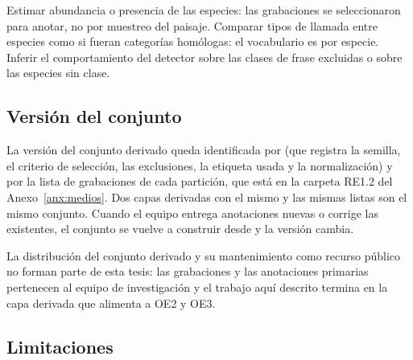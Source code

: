  Estimar abundancia o presencia de las especies:
las grabaciones se seleccionaron para anotar, no por muestreo del paisaje.
Comparar tipos de llamada entre especies como si fueran categorías homólogas: el
vocabulario es por especie. Inferir el comportamiento del detector sobre las
clases de frase excluidas o sobre las especies sin clase.

\subsection{Versión del conjunto}

La versión del conjunto derivado queda identificada por  (que
registra la semilla, el criterio de selección, las exclusiones, la etiqueta usada
y la normalización) y por la lista de grabaciones de cada partición, que está en
la carpeta RE1.2 del Anexo~\ref{anx:medios}. Dos capas derivadas con el mismo
 y las mismas listas son el mismo conjunto. Cuando el equipo entrega anotaciones nuevas o corrige las
existentes, el conjunto se vuelve a construir desde  y la versión
cambia.

 La distribución del conjunto derivado y su
mantenimiento como recurso público no forman parte de esta tesis: las grabaciones
y las anotaciones primarias pertenecen al equipo de investigación y el trabajo
aquí descrito termina en la capa derivada que alimenta a OE2 y OE3.

\subsection{Limitaciones}
\label{sec:limitaciones}

